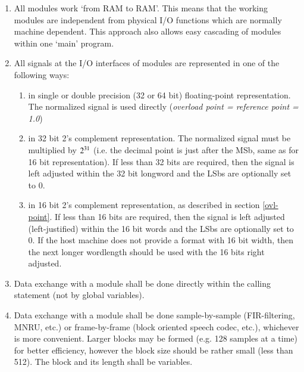 \begin{enumerate}

\item All modules work `from RAM to RAM'. This means that the working
      modules are independent from physical I/O functions which are
      normally machine dependent.  This approach also allows easy
      cascading of modules within one `main' program.

\item All signals at the I/O interfaces of modules are represented in one
      of the following ways:

      \begin{enumerate}
        \item in single or double precision (32 or 64 bit) floating-point
              representation.  The normalized signal is used directly
              ({\em overload point = reference point = 1.0})

        \item in 32 bit 2's complement representation. The normalized signal
              must be multiplied by $\rm 2^{31}$ (i.e. the decimal
              point is just after the MSb, same as for 16 bit
              representation).  If less than 32 bits are required,
              then the signal is left adjusted within the 32 bit
              longword and the LSbs are optionally set to 0.

        \item in 16 bit 2's complement representation, as described in
              section \ref{ovl-point}.  If less than 16 bits are
              required, then the signal is left adjusted
              (left-justified) within the 16 bit words and the LSbs
              are optionally set to 0. If the host machine does not
              provide a format with 16 bit width, then the next
              longer wordlength should be used with the 16 bits right
              adjusted.
      \end{enumerate}

\item Data exchange with a module shall be done directly within the
      calling statement (not by global variables).

\item Data exchange with a module shall be done sample-by-sample
      (FIR-filtering, MNRU, etc.) or frame-by-frame (block oriented
      speech codec, etc.), whichever is more convenient. Larger
      blocks may be formed (e.g. 128 samples at a time) for better
      efficiency, however the block size should be rather small
      (less than 512). The block and its length shall be variables.


\end{enumerate}
